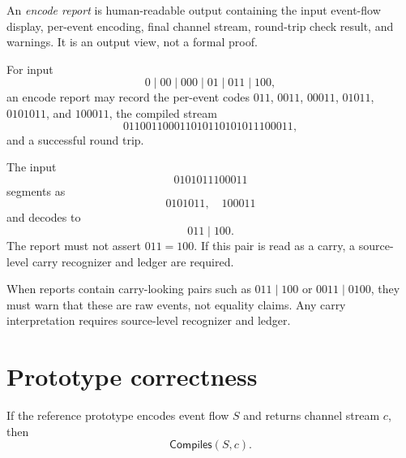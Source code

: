 \begin{definition}
\label{def:minimal-prototype-encode-report}
An \emph{encode report} is human-readable output containing the input event-flow display, per-event encoding, final channel stream, round-trip check result, and warnings. It is an output view, not a formal proof.
\end{definition}

\begin{example}
\label{ex:minimal-prototype-completion-report}
For input
$$
  0\mid 00\mid 000\mid 01\mid 011\mid 100,
$$
an encode report may record the per-event codes $011$, $0011$, $00011$, $01011$, $0101011$, and $100011$, the compiled stream
$$
  011001100011010110101011100011,
$$
and a successful round trip.
\end{example}

\begin{example}
\label{ex:minimal-prototype-carry-looking-report}
The input
$$
  0101011100011
$$
segments as
$$
  0101011,\quad 100011
$$
and decodes to
$$
  011\mid 100.
$$
The report must not assert $011=100$. If this pair is read as a carry, a source-level carry recognizer and ledger are required.
\end{example}

\begin{principle}
\label{prin:minimal-prototype-reports-warnings}
When reports contain carry-looking pairs such as $011\mid 100$ or $0011\mid 0100$, they must warn that these are raw events, not equality claims. Any carry interpretation requires source-level recognizer and ledger.
\end{principle}

\section{Prototype correctness}
\label{sec:minimal-prototype-correctness}

\begin{theorem}
\label{thm:minimal-prototype-encoder-soundness}
If the reference prototype encodes event flow $S$ and returns channel stream $c$, then
$$
  \mathsf{Compiles}(S,c).
$$
\end{theorem}


